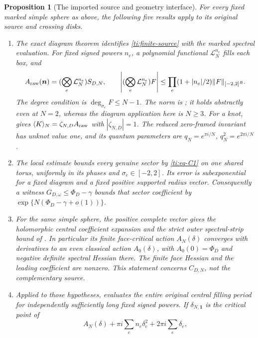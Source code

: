 \documentclass[11pt]{article}
\numberwithin{equation}{section}
\newtheorem{proposition}[theorem]{Proposition}
\theoremstyle{definition}\newtheorem{definition}[theorem]{Definition}
\theoremstyle{remark}\newtheorem{remark}[theorem]{Remark}
\begin{document}
\begin{proposition}[The imported source and geometry interface]
\label{ti:imports}
For every fixed marked simple sphere as above, the following five
results apply to its original source and crossing disks.
\begin{enumerate}[label=\textup{(\roman*)},leftmargin=*]
\item The exact diagram theorem
\cite[Theorem 9.1 and Corollary 9.2]{Finite} identifies
\eqref{ti:finite-source} with the marked spectral evaluation.
For fixed signed powers \(n_e\), a polynomial functional
\(\mathcal L_N^{n_e}\) fills each box, and
\[
A_{\rm raw}(\boldsymbol n)=
 (\bigotimes_e\mathcal L_N^{n_e})S_{D,N},\qquad
\left| (\bigotimes_e\mathcal L_N^{n_e})F\right|
\le\prod_e(1+|n_e|/2)\|F\|_{[-2,2]^R}.
\]
The degree condition is \(\deg_{\sigma_e}F\le N-1\).
The norm is \cite[Theorem 1.1]{Finite}; it holds abstractly even at
\(N=2\), whereas the diagram application here is \(N\ge3\).
For a knot, \cite[Theorem 10.1]{Finite} gives
\(\langle K\rangle_N=\zeta_{N,D}A_{\rm raw}\) with
\(|\zeta_{N,D}|=1\). The reduced zero-framed invariant has unknot
value one, and its quantum parameters are
\(q_N=e^{\pi i/N}\), \(q_N^2=e^{2\pi i/N}\).
\item The local estimate \cite[Theorem 1.1]{CasimirSources} bounds every genuine
sector by \eqref{ti:eq-C1} on one shared torus, uniformly in its
phases and \(\sigma_e\in[-2,2]\). Its error is subexponential
for a fixed diagram and a fixed positive supported radius vector.
Consequently a witness \(G_{D,\omega}\le\Phi_D-\gamma\)
bounds that sector coefficient by
\(\exp\{N(\Phi_D-\gamma+o(1))\}\).
\item For the same simple sphere, the positive complete vector gives
the holomorphic central coefficient expansion and the strict outer
spectral-strip bound of \cite[Theorem 8.1]{CasimirSources}. In particular its
finite face-critical action \(A_N(\delta)\) converges with derivatives
to an even classical action \(A_0(\delta)\), with
\(A_0(0)=\Phi_D\) and negative definite spectral Hessian there.
The finite face Hessian and the leading coefficient are nonzero.
This statement concerns \(C_{D,N}\), not the complementary source.
\item Applied to those hypotheses,
\cite[Theorem 1.1]{Oscillatory} evaluates the entire original
central filling period for independently sufficiently long fixed
signed powers. If \(\delta_{N,\mathbf1}\) is the critical point of
\[
A_N(\delta)+\pi i\sum_e n_e\delta_e^2
                       +2\pi i\sum_e\delta_e,
\]

\end{enumerate}
\end{proposition}
\end{document}
